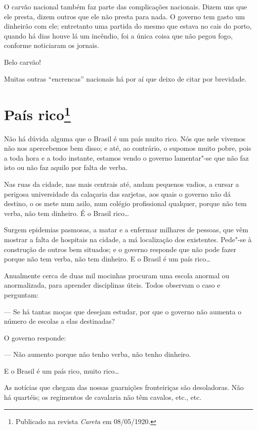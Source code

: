 O carvão nacional também faz parte das complicações nacionais. Dizem uns
que ele presta, dizem outros que ele não presta para nada. O governo tem
gasto um dinheirão com ele; entretanto uma partida do mesmo que estava
no cais do porto, quando há dias houve lá um incêndio, foi a única coisa
que não pegou fogo, conforme noticiaram os jornais.

Belo carvão!

Muitas outras ``encrencas'' nacionais há por aí que deixo de citar por
brevidade.



\chapter[País rico]{País rico\footnote[*]{Publicado na revista \emph{Careta} em 08/05/1920.}}

Não há dúvida alguma que o Brasil é um país muito rico. Nós que nele
vivemos não nos apercebemos bem disso; e até, ao contrário, o supomos
muito pobre, pois a toda hora e a todo instante, estamos vendo o governo
lamentar"-se que não faz isto ou não faz aquilo por falta de verba.

Nas ruas da cidade, nas mais centrais até, andam pequenos vadios, a
cursar a perigosa universidade da calaçaria das sarjetas, aos quais o
governo não dá destino, o os mete num asilo, num colégio profissional
qualquer, porque não tem verba, não tem dinheiro. É o Brasil rico\ldots{}

Surgem epidemias pasmosas, a matar e a enfermar milhares de pessoas, que
vêm mostrar a falta de hospitais na cidade, a má localização dos
existentes. Pede"-se à construção de outros bem situados; e o governo
responde que não pode fazer porque não tem verba, não tem dinheiro. E o
Brasil é um país rico\ldots{}

Anualmente cerca de duas mil mocinhas procuram uma escola anormal ou
anormalizada, para aprender disciplinas úteis. Todos observam o caso e
perguntam:

--- Se há tantas moças que desejam estudar, por que o governo não aumenta
o número de escolas a elas destinadas?

O governo responde:

--- Não aumento porque não tenho verba, não tenho dinheiro.

E o Brasil é um país rico, muito rico\ldots{}

As notícias que chegam das nossas guarnições fronteiriças são
desoladoras. Não há quartéis; os regimentos de cavalaria não têm
cavalos, etc., etc.

